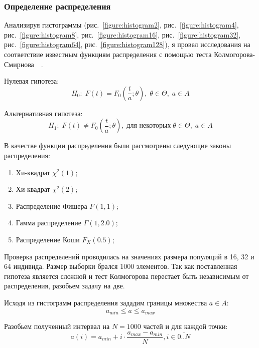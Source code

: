 \clearpage
\subsubsection{Определение распределения}

Анализируя гистограммы (рис.~\ref{figure:histogram2}, рис.~\ref{figure:histogram4}, рис.~\ref{figure:histogram8}, рис.~\ref{figure:histogram16}, рис.~\ref{figure:histogram32}, рис.~\ref{figure:histogram64}, рис.~\ref{figure:histogram128}), я провел исследования на соответствие известным функциям распределения с помощью теста Колмогорова-Смирнова~\cite{KolmogorovSmirnov}~\cite{BlueStatistics}.

Нулевая гипотеза:
\begin{equation}
\label{equation:distrHyp0}
H_0: \; F(t) = F_0(\frac{t}{a};\theta), \; \theta \in \Theta, \; a \in A
\end{equation}

Альтернативная гипотеза:
\begin{equation}
\label{equation:distrHyp1}
H_1: \; F(t) \neq F_0(\frac{t}{a};\theta), \; \text{для некоторых} \; \theta \in \Theta, \; a \in A
\end{equation}

В качестве функции распределения были рассмотрены следующие законы распределения:
\begin{enumerate}
\item Хи-квадрат $\chi^2(1)$;
\item Хи-квадрат $\chi^2(2)$;
\item Распределение Фишера $F(1, 1)$;
\item Гамма распределение $\Gamma(1, 2.0)$;
\item Распределение Коши $F_X(0.5)$;
\end{enumerate}

Проверка распределений проводилась на значениях размера популяций в 16, 32 и 64 индивида. Размер выборки брался 1000 элементов. Так как поставленная гипотеза является сложной и тест Колмогорова перестает быть независимым от распределения, разобьем задачу на две. 

Исходя из гистограмм распределения зададим границы множества $a \in A$:
\begin{equation}
a_{min} \leq a \leq a_{max}
\end{equation}

Разобьем полученный интервал на $N = 1000$ частей и для каждой точки:
\begin{equation}
a(i) = a_{min} + i \cdot \frac{a_{max} - a_{min}}{N}, i \in \overline{0 .. N}
\end{equation}

